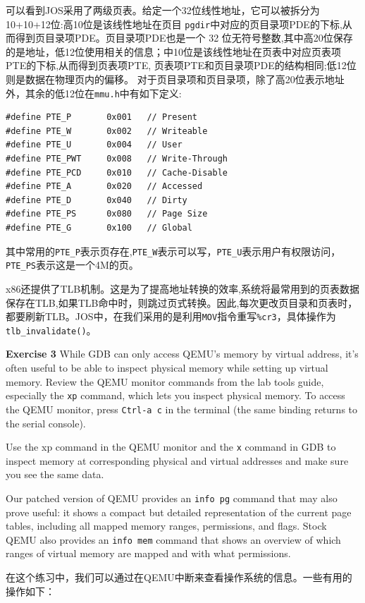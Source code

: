 \documentclass[11pt]{article}
\begin{document}
可以看到JOS采用了两级页表。给定一个32位线性地址，它可以被拆分为10+10+12位:高10位是该线性地址在页目
\lstinline|pgdir|中对应的页目录项PDE的下标,从而得到页目录项PDE。页目录项PDE也是一个 32
位无符号整数,其中高20位保存的是地址，低12位使用相关的信息；中10位是该线性地址在页表中对应页表项PTE的下标,从而得到页表项PTE,
页表项PTE和页目录项PDE的结构相同;低12位则是数据在物理页内的偏移。
对于页目录项和页目录项，除了高20位表示地址外，其余的低12位在\lstinline|mmu.h|中有如下定义:
\begin{lstlisting}[title=inc/mmu.h]
#define PTE_P		0x001	// Present
#define PTE_W		0x002	// Writeable
#define PTE_U		0x004	// User
#define PTE_PWT		0x008	// Write-Through
#define PTE_PCD		0x010	// Cache-Disable
#define PTE_A		0x020	// Accessed
#define PTE_D		0x040	// Dirty
#define PTE_PS		0x080	// Page Size
#define PTE_G		0x100	// Global
\end{lstlisting}
其中常用的\lstinline|PTE_P|表示页存在,\lstinline|PTE_W|表示可以写，\lstinline|PTE_U|表示用户有权限访问，\lstinline|PTE_PS|表示这是一个4M的页。

x86还提供了TLB机制。这是为了提高地址转换的效率,系统将最常用到的页表数据保存在TLB,如果TLB命中时，则跳过页式转换。因此,每次更改页目录和页表时，都要刷新TLB。JOS中，在我们采用的是利用\lstinline|MOV|指令重写\lstinline|%cr3|，具体操作为\lstinline|tlb_invalidate()|。

\begin{framed}
\noindent\textbf{Exercise 3} While GDB can only access QEMU's memory by virtual address, it's often useful to be able to inspect physical memory while setting up virtual memory. Review the QEMU monitor commands from the lab tools guide, especially the \lstinline|xp| command, which lets you inspect physical memory. To access the QEMU monitor, press \lstinline|Ctrl-a c| in the terminal (the same binding returns to the serial console).

Use the xp command in the QEMU monitor and the \lstinline|x| command in GDB to inspect memory at corresponding physical and virtual addresses and make sure you see the same data.

Our patched version of QEMU provides an \lstinline|info pg| command that may also prove useful: it shows a compact but detailed representation of the current page tables, including all mapped memory ranges, permissions, and flags. Stock QEMU also provides an \lstinline|info mem| command that shows an overview of which ranges of virtual memory are mapped and with what permissions. 
\end{framed}
在这个练习中，我们可以通过在QEMU中断来查看操作系统的信息。一些有用的操作如下：
\end{document}
